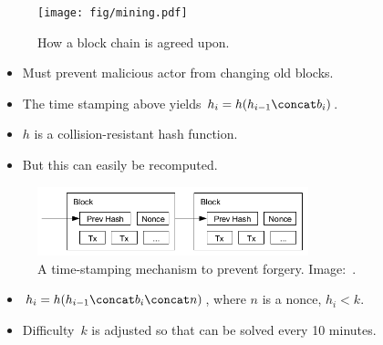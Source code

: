 \begin{frame}
  \begin{figure}
    \texttt{[image: fig/mining.pdf]}
    \caption{How a block chain is agreed upon.}
  \end{figure}
\end{frame}

\begin{frame}
  \begin{remark}[Forgery]
    \begin{itemize}
      \item Must prevent malicious actor from changing old blocks.
      \item The time stamping above yields \(h_i = h(h_{i-1}\concat b_i)\).
      \item \(h\) is a collision-resistant hash function.
      \item But this can easily be recomputed.
    \end{itemize}
  \end{remark}
\end{frame}

\begin{frame}
  \begin{figure}
    \includegraphics[width=0.7\textwidth]{fig/bitcoin-pow.png}
    \caption{A time-stamping mechanism to prevent forgery.
    Image:~\cite{Nakamoto2008bap}.}
  \end{figure}
  
  \begin{solution}
    \begin{itemize}
      \item \(h_i = h(h_{i-1}\concat b_i\concat n)\),
        where \(n\) is a nonce, \(h_i < k\).
    \end{itemize}
  \end{solution}

  \pause

  \begin{remark}
    \begin{itemize}
      \item Difficulty~\(k\) is adjusted so that can be solved every 
        10 minutes.
    \end{itemize}
  \end{remark}
\end{frame}

